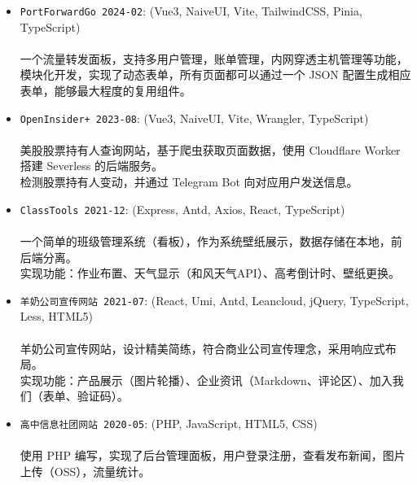 \documentclass[zh]{resume}
\begin{document}
\begin{itemize}
  \item \texttt{PortForwardGo 2024-02}:
    (Vue3, NaiveUI, Vite, TailwindCSS, Pinia, TypeScript)\\
    \\
    一个流量转发面板，支持多用户管理，账单管理，内网穿透主机管理等功能，
    模块化开发，实现了动态表单，所有页面都可以通过一个 JSON 配置生成相应表单，能够最大程度的复用组件。\\
  \item \texttt{OpenInsider+ 2023-08}:
    (Vue3, NaiveUI, Vite, Wrangler, TypeScript)\\
    \\
    美股股票持有人查询网站，基于爬虫获取页面数据，使用 Cloudflare Worker 搭建 Severless 的后端服务。\\
    检测股票持有人变动，并通过 Telegram Bot 向对应用户发送信息。\\
  \item \texttt{ClassTools 2021-12}:
    (Express, Antd, Axios, React, TypeScript)\\
    \\
    一个简单的班级管理系统（看板），作为系统壁纸展示，数据存储在本地，前后端分离。\\
    实现功能：作业布置、天气显示（和风天气API）、高考倒计时、壁纸更换。\\
  \item \texttt{羊奶公司宣传网站 2021-07}:
    (React, Umi, Antd, Leancloud, jQuery, TypeScript, Less, HTML5)\\
    \\
    羊奶公司宣传网站，设计精美简练，符合商业公司宣传理念，采用响应式布局。\\
    实现功能：产品展示（图片轮播）、企业资讯（Markdown、评论区）、加入我们（表单、验证码）。\\
  \item \texttt{高中信息社团网站 2020-05}:
    (PHP, JavaScript, HTML5, CSS)\\
    \\
    使用 PHP 编写，实现了后台管理面板，用户登录注册，查看发布新闻，图片上传（OSS），流量统计。
\end{itemize}
\end{document}

